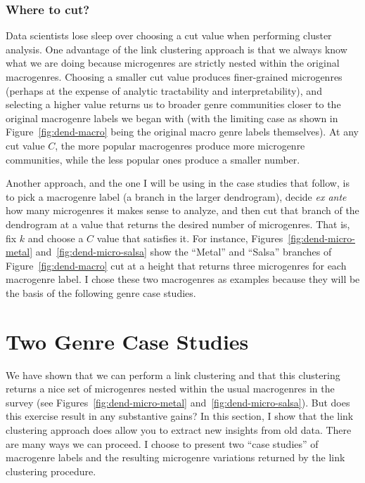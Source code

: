 \documentclass[a4paper,12pt]{extarticle}
\begin{document}
\subsubsection{Where to cut?}
Data scientists lose sleep over choosing a cut value when performing cluster analysis. One advantage of the link clustering approach is that we always know what we are doing because microgenres are strictly nested within the original macrogenres. Choosing a smaller cut value produces finer-grained microgenres (perhaps at the expense of analytic tractability and interpretability), and selecting a higher value returns us to broader genre communities closer to the original macrogenre labels we began with (with the limiting case as shown in Figure~\ref{fig:dend-macro} being the original macro genre labels themselves). At any cut value $C$, the more popular macrogenres produce more microgenre communities, while the less popular ones produce a smaller number. 

Another approach, and the one I will be using in the case studies that follow, is to pick a macrogenre label (a branch in the larger dendrogram), decide \textit{ex ante} how many microgenres it makes sense to analyze, and then cut that branch of the dendrogram at a value that returns the desired number of microgenres. That is, fix $k$ and choose a $C$ value that satisfies it. For instance, Figures~\ref{fig:dend-micro-metal} and~\ref{fig:dend-micro-salsa} show the ``Metal'' and ``Salsa'' branches of Figure~\ref{fig:dend-macro} cut at a height that returns three microgenres for each macrogenre label. I chose these two macrogenres as examples because they will be the basis of the following genre case studies. 
 
\section{Two Genre Case Studies}
We have shown that we can perform a link clustering and that this clustering returns a nice set of microgenres nested within the usual macrogenres in the survey (see Figures~\ref{fig:dend-micro-metal} and~\ref{fig:dend-micro-salsa}). But does this exercise result in any substantive gains? In this section, I show that the link clustering approach does allow you to extract new insights from old data. There are many ways we can proceed. I choose to present two ``case studies'' of macrogenre labels and the resulting microgenre variations returned by the link clustering procedure. 
\end{document}
